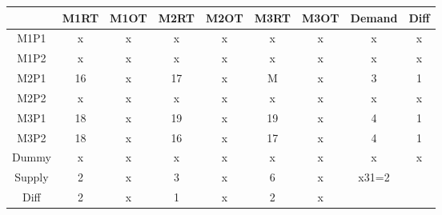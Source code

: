 \documentclass{article}%
\begin{document}
\begin{tabular}{c|c|ccccccc}
    & M1RT & M1OT & M2RT & M2OT & M3RT & M3OT & Demand               & Diff                 \\
    \midrule
    M1P1   & x    & x    & x    & x    & x    & x    & x                    & x                    \\
    M1P2   & x    & x    & x    & x    & x    & x    & x                    & x                    \\
    \cmidrule{2-9}
    M2P1   & 16   & x    & 17   & x    & M    & x    & 3                    & 1                    \\
    \cmidrule{2-9}
    M2P2   & x    & x    & x    & x    & x    & x    & x                    & x                    \\
    M3P1   & 18   & x    & 19   & x    & 19   & x    & 4                    & 1                    \\
    M3P2   & 18   & x    & 16   & x    & 17   & x    & 4                    & 1                    \\
    Dummy  & x    & x    & x    & x    & x    & x    & x                    & x                    \\
    Supply & 2    & x    & 3    & x    & 6    & x    & x31=2                &                      \\
    Diff   & 2    & x    & 1    & x    & 2    & x    &                      &                      \\
\end{tabular}
\newline
\newline
\end{document}
